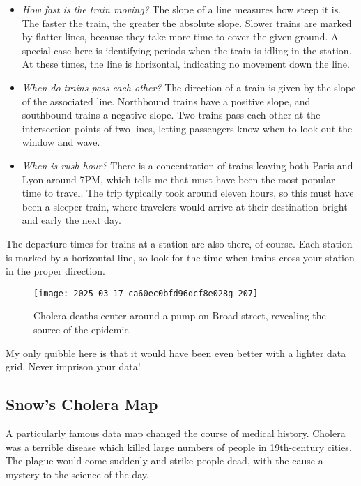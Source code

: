 \documentclass[10pt]{article}
\begin{document}
\begin{itemize}
  \item \textit{How fast is the train moving?} The slope of a line measures how steep it is. The faster the train, the greater the absolute slope. Slower trains are marked by flatter lines, because they take more time to cover the given ground. A special case here is identifying periods when the train is idling in the station. At these times, the line is horizontal, indicating no movement down the line.
  \item \textit{When do trains pass each other?} The direction of a train is given by the slope of the associated line. Northbound trains have a positive slope, and southbound trains a negative slope. Two trains pass each other at the intersection points of two lines, letting passengers know when to look out the window and wave.
  \item \textit{When is rush hour?} There is a concentration of trains leaving both Paris and Lyon around 7PM, which tells me that must have been the most popular time to travel. The trip typically took around eleven hours, so this must have been a sleeper train, where travelers would arrive at their destination bright and early the next day.
\end{itemize}

The departure times for trains at a station are also there, of course. Each station is marked by a horizontal line, so look for the time when trains cross your station in the proper direction.

\begin{figure}[htbp]
    \centering
    \texttt{[image: 2025\_03\_17\_ca60ec0bfd96dcf8e028g-207]}
    \caption{Cholera deaths center around a pump on Broad street, revealing the source of the epidemic.}
    \label{fig:cholera_deaths}
\end{figure}

My only quibble here is that it would have been even better with a lighter data grid. Never imprison your data!

\subsection{Snow's Cholera Map}
A particularly famous data map changed the course of medical history. Cholera was a terrible disease which killed large numbers of people in 19th-century cities. The plague would come suddenly and strike people dead, with the cause a mystery to the science of the day.
\end{document}
